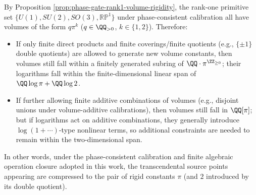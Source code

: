 \begin{remark}\label{rem:phase-gate-volume-constants-closure}
By Proposition \ref{prop:phase-gate-rank1-volume-rigidity}, the rank-one primitive set
\(
\{U(1),SU(2),SO(3),\mathbb{RP}^{1}\}
\)
under phase-consistent calibration all have volumes of the form \(q\pi^{k}\) (\(q\in\QQ_{>0}\), \(k\in\{1,2\}\)).
Therefore:
\begin{itemize}
  \item If only finite direct products and finite coverings/finite quotients (e.g., \(\{\pm 1\}\) double quotients) are allowed to generate new volume constants, then volumes still fall within a finitely generated subring of \(\QQ\cdot\pi^{\ZZ_{\ge 0}}\); their logarithms fall within the finite-dimensional linear span of \(\QQ\log\pi+\QQ\log 2\).
  \item If further allowing finite additive combinations of volumes (e.g., disjoint unions under volume-additive calibrations), then volumes still fall in \(\QQ[\pi]\); but if logarithms act on additive combinations, they generally introduce \(\log(1+\cdots)\)-type nonlinear terms, so additional constraints are needed to remain within the two-dimensional span.
\end{itemize}
In other words, under the phase-consistent calibration and finite algebraic operation closure adopted in this work, the transcendental source points appearing are compressed to the pair of rigid constants \(\pi\) (and \(2\) introduced by its double quotient).
\end{remark}
